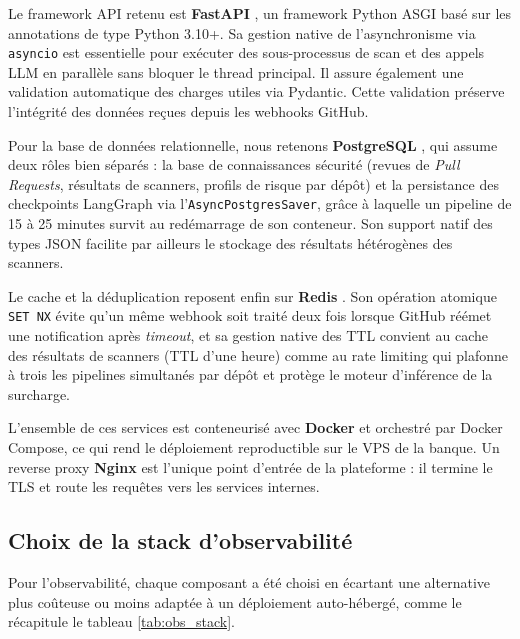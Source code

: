         Le framework API retenu est \textbf{FastAPI} \cite{FastAPI}, un framework
        Python ASGI basé sur les annotations de type Python 3.10+.
        Sa gestion native de l'asynchronisme via \texttt{asyncio} est essentielle pour
        exécuter des sous-processus de scan et des appels LLM en parallèle sans
        bloquer le thread principal. Il assure également une validation automatique des
        charges utiles via Pydantic. Cette validation préserve l'intégrité des données reçues
        depuis les webhooks GitHub.

        Pour la base de données relationnelle, nous retenons \textbf{PostgreSQL}
        \cite{PostgreSQL}, qui assume deux rôles bien séparés : la base de
        connaissances sécurité (revues de \textit{Pull Requests}, résultats de
        scanners, profils de risque par dépôt) et la persistance des checkpoints
        LangGraph via l'\texttt{AsyncPostgresSaver}, grâce à laquelle un pipeline de
        15 à 25 minutes survit au redémarrage de son conteneur. Son support natif des
        types JSON facilite par ailleurs le stockage des résultats hétérogènes des
        scanners.

        Le cache et la déduplication reposent enfin sur \textbf{Redis} \cite{Redis}.
        Son opération atomique \texttt{SET NX} évite qu'un même webhook soit traité
        deux fois lorsque GitHub réémet une notification après \textit{timeout}, et sa
        gestion native des TTL convient au cache des résultats de scanners (TTL d'une
        heure) comme au rate limiting qui plafonne à trois les pipelines simultanés
        par dépôt et protège le moteur d'inférence de la surcharge.

        L'ensemble de ces services est conteneurisé avec \textbf{Docker} \cite{Docker}
        et orchestré par Docker Compose, ce qui rend le déploiement reproductible sur
        le VPS de la banque. Un reverse proxy \textbf{Nginx} \cite{NGINX} est
        l'unique point d'entrée de la plateforme : il termine le TLS et route les
        requêtes vers les services internes.

    \subsection{Choix de la stack d'observabilité}

        Pour l'observabilité, chaque composant a été choisi en écartant une alternative
        plus coûteuse ou moins adaptée à un déploiement auto-hébergé, comme le récapitule
        le tableau \ref{tab:obs_stack}.

